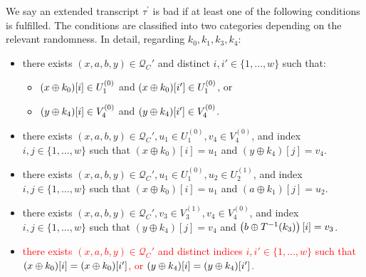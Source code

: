 \begin{definition}
\label{defn:bad-tau-4-rounds}

We say an extended transcript $\tau^{\prime}$ is bad if at least one of the following conditions is fulfilled. The conditions are classified into two categories depending on the relevant randomness. In detail, regarding $k_0,k_1,k_3,k_4$:
\begin{itemize}[leftmargin=10mm]
	\item[\bone] there exists $(x,a,b,y) \in \mathcal{Q}_{C}'$ and distinct $i, i' \in \{1, \ldots, w\}$ such that:
	\begin{itemize}
		\item $(x\oplus k_0)[i]\in U_1^{(0)}$ and $(x\oplus k_0)[i']\in U_1^{(0)}$, or
		\item $(y\oplus k_4)[i]\in V_4^{(0)}$ and $(y\oplus k_4)[i']\in V_4^{(0)}$.
	\end{itemize}
	\item[\btwo] there exists $(x,a,b,y) \in \mathcal{Q}_{C}', u_1 \in U_1^{(0)}, v_4 \in V_4^{(0)}$, and index $i, j \in \{1, \ldots, w\}$ such that $\left(x \oplus k_{0}\right)[i]=u_1$ and $\left(y \oplus k_{4}\right)[j]=v_4$.
	\item[\bthree] there exists $(x,a,b,y) \in \mathcal{Q}_{C}', u_1 \in U_1^{(0)}, u_2\in U_2^{(1)}$, and index $i, j \in \{1, \ldots, w\}$ such that $\left(x \oplus k_{0}\right)[i]=u_1$ and $\left(a\oplus k_{1}\right)[j]=u_2$.
	\item[\bfour] there exists $(x,a,b,y) \in \mathcal{Q}_{C}', v_{3}\in V_3^{(1)}, v_{4}\in V_4^{(0)}$, and index $i, j \in \{1, \ldots, w\}$ such that $\left(y \oplus k_{4}\right)[j]=v_4$ and $\left(b\oplus T^{-1}(k_3)\right) [i]=v_3$.
	\item[\bfive] \textcolor{red}{there exists $(x,a,b,y) \in \mathcal{Q}_{C}'$ and distinct indices $i, i' \in \{1, \ldots, w\}$ such that $(x\oplus k_0)[i]=(x\oplus k_0)[i']$, or $(y\oplus k_4)[i]=(y\oplus k_4)[i']$.}
\end{itemize}
%
%

\end{definition}
